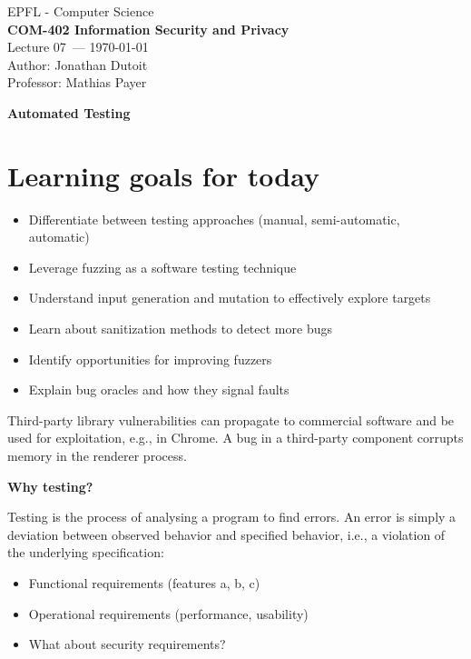 \documentclass[11pt]{article}
\newcommand{\coursename}{COM-402 Information Security and Privacy}
\newcommand{\lecturenum}{07}
\newcommand{\lecturedate}{\today}
\newcommand{\professor}{Mathias Payer}
\begin{document}
\begin{center}
  {\large EPFL - Computer Science} \\[0.5em]
  {\Large \textbf{\coursename}} \\[0.5em]
  {\large Lecture \lecturenum\ --- \lecturedate} \\[0.5em]
  {\large Author: Jonathan Dutoit} \\[0.5em]
  {\large Professor: \professor} \\[0.5em]
\end{center}

\vspace{2cm}

\begin{center}
  {\LARGE \textbf{Automated Testing}}
\end{center}

\vspace{1cm}

\section*{Learning goals for today}

\begin{itemize}
	\item Differentiate between testing approaches (manual, semi-automatic, automatic)
	\item Leverage fuzzing as a software testing technique
	\item Understand input generation and mutation to effectively explore targets 
	\item Learn about sanitization methods to detect more bugs
	\item Identify opportunities for improving fuzzers
	\item Explain bug oracles and how they signal faults
\end{itemize}

Third-party library vulnerabilities can propagate to commercial software and be used for exploitation, e.g., in Chrome. A bug in a third-party component corrupts memory in the renderer process. 

\textbf{Why testing?}

Testing is the process of analysing a program to find errors. An error is simply a deviation between observed behavior and specified behavior, i.e., a violation of the underlying specification: 

\begin{itemize}
	\item Functional requirements (features a, b, c)
	\item Operational requirements (performance, usability)
	\item What about security requirements?
\end{itemize}
\end{document}
